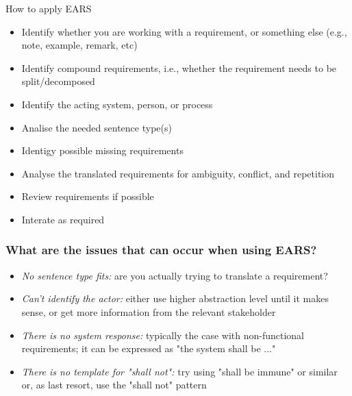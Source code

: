 \documentclass[aspectratio=169]{beamer}
\begin{document}
\begin{slide}{How to apply EARS}
  \begin{itemize}
  \item Identify whether you are working with a requirement, or something else (e.g., note, example, remark, etc)
  \item Identify compound requirements, i.e., whether the requirement needs to be split/decomposed 
  \item Identify the acting system, person, or process
  \item Analise the needed sentence type(s)
  \item Identigy possible missing requirements
  \item Analyse the translated requirements for ambiguity, conflict, and repetition
  \item Review requirements if possible
  \item Interate as required
  \end{itemize}
\end{slide}
%
%
\begin{frame}
  \frametitle{What are the issues that can occur when using EARS?}
  \begin{itemize}
  \item {\it No sentence type fits:} are you actually trying to translate a requirement?
  \item {\it Can't identify the actor:} either use higher abstraction level until it makes sense, or get more information from the relevant stakeholder
  \item {\it There is no system response:}  typically the case with non-functional requirements; it can be expressed as "the system shall be ..."
  \item {\it There is no template for "shall not":} try using "shall be immune" or similar or, as last resort, use the "shall not" pattern
  \end{itemize}
  
\end{frame}
\end{document}
